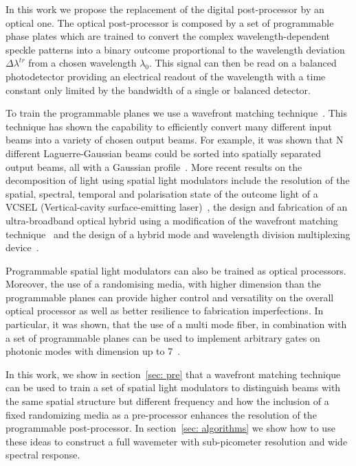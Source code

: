 \documentclass{optica-article}
\begin{document}
In this work we propose the replacement of the digital post-processor by an optical one. The optical post-processor is composed by a set of programmable phase plates which are trained to convert the complex wavelength-dependent speckle patterns into a binary outcome proportional to the wavelength deviation $\Delta\lambda^\mathit{tr}$ from a chosen wavelength $\lambda_0$. This signal can then be read on a balanced photodetector providing an electrical readout of the wavelength with a time constant only limited by the bandwidth of a single or balanced detector.

To train the programmable planes we use a wavefront matching technique~\cite{sakamaki2007new}. This technique has shown  the capability to efficiently convert many different input beams into a variety of chosen output beams. For example, it was shown that N different Laguerre-Gaussian beams could be sorted into spatially separated output beams, all with a Gaussian profile~\cite{fontaine2019laguerre}. More recent results on the decomposition of light using spatial light modulators include the resolution of the spatial, spectral, temporal and polarisation state of the outcome light of a VCSEL (Vertical-cavity surface-emitting laser)~\cite{ploschner2022spatial}, the design and fabrication of an ultra-broadband optical hybrid using a modification of the wavefront matching technique~\cite{zhang2020ultra} and the design of a hybrid mode and wavelength division multiplexing device~\cite{wei2022parallel}.

Programmable spatial light modulators can also be trained as optical processors. Moreover, the use of a randomising media, with higher dimension than the programmable planes can provide higher control and versatility on the overall optical processor as well as better resilience to fabrication imperfections. In particular, it was shown, that the use of a multi mode fiber, in combination with a set of programmable planes can be used to implement arbitrary gates on photonic modes with dimension up to 7~\cite{marcucci2020programming}.

In this work, we show in section~\ref{sec: pre} that a wavefront matching technique can be used to train a set of spatial light modulators to distinguish beams with the same spatial structure but different frequency and how the inclusion of a fixed randomizing media as a pre-processor enhances the resolution of the programmable post-processor. In section~\ref{sec: algorithms} we show how to use these ideas to construct a full wavemeter with sub-picometer resolution and wide spectral response.
\end{document}
